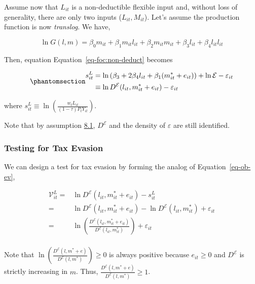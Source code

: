 \documentclass[
  12pt]{article}
\theoremstyle{definition}
\theoremstyle{remark}
\begin{document}
Assume now that \(L_{it}\) is a non-deductible flexible input and,
without loss of generality, there are only two inputs
(\(L_{it}, M_{it}\)). Let's assume the production function is now
\emph{translog}. We have,

\[
 \ln G(l,m)=\beta_0m_{it}+\beta_1m_{it}l_{it}+\beta_2m_{it}m_{it}+\beta_3l_{it}+\beta_4l_{it}l_{it}
\]

Then, equation Equation~\ref{eq-foc:non-deduct} becomes

\begin{equation}\phantomsection\label{eq-translog-share}{
\begin{aligned}
    s_{it}^{L}&=\ln \left(\beta_3+2\beta_4l_{it}+\beta_1(m^*_{it}+e_{it})\right) + \ln \mathcal{E}- \varepsilon_{it} \\
    &\equiv \ln D^{\mathcal{E}}(l_{it},m^*_{it}+e_{it})- \varepsilon_{it} 
\end{aligned}
}\end{equation}

where
\(s_{it}^{L} \equiv\ln\left(\frac{w_t L_{it}}{(1-\tau)P_{t}Y_{it}}\right)\).

Note that by assumption \hyperref[ass-non-ev]{8.1}, \(D^{\mathcal{E}}\)
and the density of \(\varepsilon\) are still identified.

\subsubsection{Testing for Tax Evasion}\label{testing-for-tax-evasion}

We can design a test for tax evasion by forming the analog of
Equation~\ref{eq-ob-ev},

\[
\begin{aligned}
\mathcal{V}_{it}^{L} =&\ln D^{\mathcal{E}}(l_{it},m_{it}^*+e_{it})-s_{it}^L\\
    =&\ln D^{\mathcal{E}}(l_{it},m_{it}^*+e_{it})-\ln D^{\mathcal{E}}(l_{it},m_{it}^*)+\varepsilon_{it}\\
    =&\ln\left(\frac{D^{\mathcal{E}}(l_{it},m_{it}^*+e_{it})}{D^{\mathcal{E}}(l_{it},m_{it}^*)}\right)+\varepsilon_{it}\\
\end{aligned}
\]

Note that
\(\ln\left(\frac{D^{\mathcal{E}}(l,m^*+e)}{D^{\mathcal{E}}(l,m^*)}\right)\ge0\)
is always positive because \(e_{it}\ge0\) and \(D^{\mathcal{E}}\) is
strictly increasing in \(m\). Thus,
\(\frac{D^{\mathcal{E}}(l,m^*+e)}{D^{\mathcal{E}}(l,m^*)}\ge1\).
\end{document}
